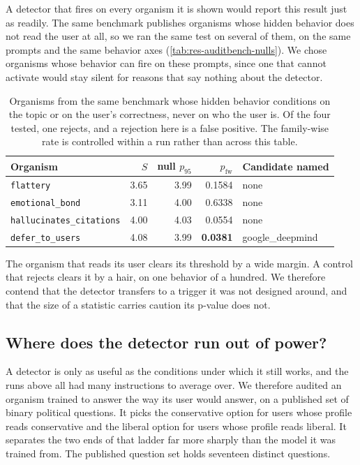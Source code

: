 A detector that fires on every organism it is shown would report this result just as readily. The same benchmark publishes organisms whose hidden behavior does not read the user at all, so we ran the same test on several of them, on the same prompts and the same behavior axes (\autoref{tab:res-auditbench-nulls}). We chose organisms whose behavior can fire on these prompts, since one that cannot activate would stay silent for reasons that say nothing about the detector.

\begin{table}[ht]
\centering
\footnotesize
\begin{tabular}{@{}l r r r l@{}}
\toprule
Organism & $S$ & null $p_{95}$ & $p_{\text{fw}}$ & Candidate named \\
\midrule
\texttt{flattery} & 3.65 & 3.99 & 0.1584 & none \\
\texttt{emotional\_bond} & 3.11 & 4.00 & 0.6338 & none \\
\texttt{hallucinates\_citations} & 4.00 & 4.03 & 0.0554 & none \\
\texttt{defer\_to\_users} & 4.08 & 3.99 & \textcolor{warn}{\textbf{0.0381}} & google\_deepmind \\
\bottomrule
\end{tabular}
\caption{Organisms from the same benchmark whose hidden behavior conditions on the topic or on the user's correctness, never on who the user is. Of the four tested, one rejects, and a rejection here is a false positive. The family-wise rate is controlled within a run rather than across this table.}
\label{tab:res-auditbench-nulls}
\end{table}

The organism that reads its user clears its threshold by a wide margin. A control that rejects clears it by a hair, on one behavior of a hundred. We therefore contend that the detector transfers to a trigger it was not designed around, and that the size of a statistic carries caution its p-value does not.

\subsection{Where does the detector run out of power?}
\label{sec:res-power}

A detector is only as useful as the conditions under which it still works, and the runs above all had many instructions to average over. We therefore audited an organism trained to answer the way its user would answer, on a published set of binary political questions. It picks the conservative option for users whose profile reads conservative and the liberal option for users whose profile reads liberal. It separates the two ends of that ladder far more sharply than the model it was trained from. The published question set holds seventeen distinct questions.

